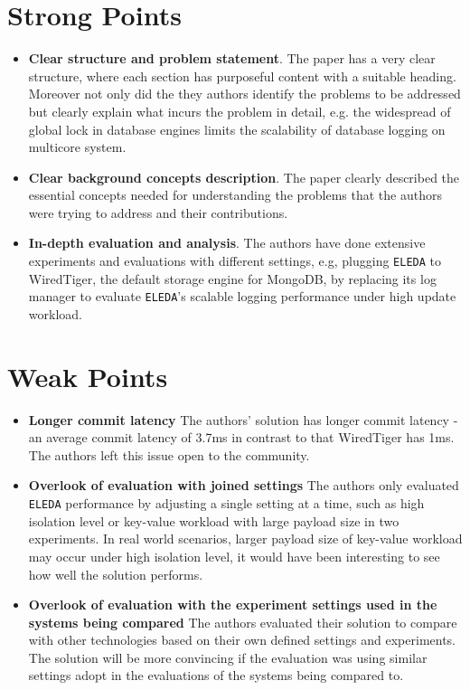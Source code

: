 \documentclass[10pt]{proc}
\begin{document}
  \section{Strong Points}
  \begin{itemize}
    \item \textbf{Clear structure and problem statement}. The paper has a very clear structure, where each section has purposeful content with a suitable heading. Moreover not only did the they authors identify the problems to be addressed but clearly explain what incurs the problem in detail, e.g. the widespread of global lock in database engines limits the scalability of database logging on multicore system.
    \item \textbf{Clear background concepts description}.  The paper clearly described the essential concepts needed for understanding the problems that the authors were trying to address and their contributions.
    \item \textbf{In-depth evaluation and analysis}. The authors have done extensive experiments and evaluations with different settings, e.g, plugging \texttt{ELEDA} to WiredTiger, the default storage engine for MongoDB, by replacing its log manager to evaluate \texttt{ELEDA}'s scalable logging performance under high update workload.
  \end{itemize}

  \section{Weak Points}
  \begin{itemize}
    \item \textbf{Longer commit latency} The authors' solution has longer commit latency - an average commit latency of 3.7ms in contrast to that WiredTiger has 1ms. The authors left this issue open to the community.
    \item \textbf{Overlook of evaluation with joined settings} The authors only evaluated \texttt{ELEDA} performance by adjusting a single setting at a time, such as high isolation level or key-value workload with large payload size in two experiments. In real world scenarios, larger payload size of key-value workload may occur under high isolation level, it would have been interesting to see how well the solution performs.
    \item \textbf{Overlook of evaluation with the experiment settings used in the systems being compared } The authors evaluated their solution to compare with other technologies based on their own defined settings and experiments. The solution will be more convincing if the evaluation was using similar settings adopt in the evaluations of the systems being compared to.

  \end{itemize}
\end{document}
